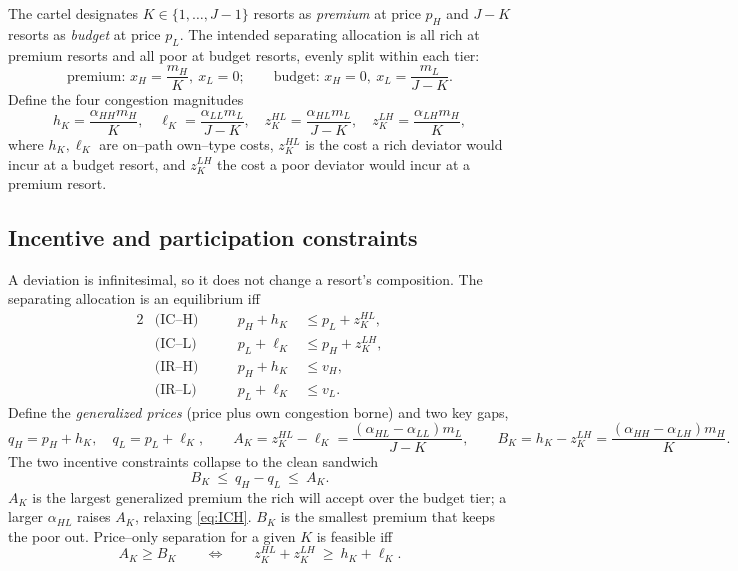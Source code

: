\documentclass[11pt]{article}
\theoremstyle{plain}
\theoremstyle{definition}
\theoremstyle{remark}
\newcommand{\mH}{m_{H}}
\newcommand{\mL}{m_{L}}
\newcommand{\vH}{v_{H}}
\newcommand{\vL}{v_{L}}
\newcommand{\aHH}{\alpha_{HH}}
\newcommand{\aHL}{\alpha_{HL}}
\newcommand{\aLH}{\alpha_{LH}}
\newcommand{\aLL}{\alpha_{LL}}
\begin{document}
The cartel designates $K\in\{1,\dots,J-1\}$ resorts as \emph{premium} at price $p_H$ and
$J-K$ resorts as \emph{budget} at price $p_L$. The intended separating allocation is all rich
at premium resorts and all poor at budget resorts, evenly split within each tier:
\begin{equation}
\text{premium: } x_H=\frac{\mH}{K},\ x_L=0;
\qquad
\text{budget: } x_H=0,\ x_L=\frac{\mL}{J-K}.
\end{equation}
Define the four congestion magnitudes
\begin{equation}
h_K=\frac{\aHH\mH}{K},\quad
\ell_K=\frac{\aLL\mL}{J-K},\quad
z^{HL}_K=\frac{\aHL\mL}{J-K},\quad
z^{LH}_K=\frac{\aLH\mH}{K},
\end{equation}
where $h_K,\ell_K$ are on--path own--type costs, $z^{HL}_K$ is the cost a rich deviator would
incur at a budget resort, and $z^{LH}_K$ the cost a poor deviator would incur at a premium
resort.

\subsection{Incentive and participation constraints}

A deviation is infinitesimal, so it does not change a resort's composition. The separating
allocation is an equilibrium iff
\begin{alignat}{2}
&\text{(IC--H)} &\qquad p_H+h_K &\le p_L+z^{HL}_K, \label{eq:ICH}\\
&\text{(IC--L)} &\qquad p_L+\ell_K &\le p_H+z^{LH}_K, \label{eq:ICL}\\
&\text{(IR--H)} &\qquad p_H+h_K &\le \vH, \label{eq:IRH}\\
&\text{(IR--L)} &\qquad p_L+\ell_K &\le \vL. \label{eq:IRL}
\end{alignat}
Define the \emph{generalized prices} (price plus own congestion borne) and two key gaps,
\begin{equation}
q_H=p_H+h_K,\quad q_L=p_L+\ell_K,
\qquad
A_K=z^{HL}_K-\ell_K=\frac{(\aHL-\aLL)\mL}{J-K},
\qquad
B_K=h_K-z^{LH}_K=\frac{(\aHH-\aLH)\mH}{K}.
\end{equation}
The two incentive constraints collapse to the clean sandwich
\begin{equation}
\boxed{\ B_K \ \le\ q_H-q_L \ \le\ A_K. \ }
\label{eq:sandwich}
\end{equation}
$A_K$ is the largest generalized premium the rich will accept over the budget tier; a larger
$\aHL$ raises $A_K$, relaxing \eqref{eq:ICH}. $B_K$ is the smallest premium that keeps the poor
out. Price--only separation for a given $K$ is feasible iff
\begin{equation}
A_K\ge B_K
\qquad\Longleftrightarrow\qquad
z^{HL}_K+z^{LH}_K\ \ge\ h_K+\ell_K .
\label{eq:feasible}
\end{equation}
\end{document}
